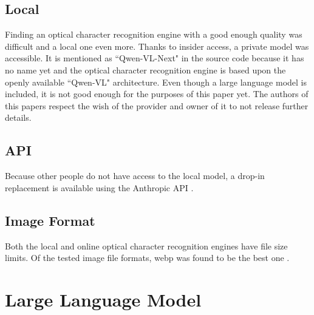 \documentclass[a4paper,11pt]{report}
\begin{document}
        \section{Local}
            Finding an optical character recognition engine with a good enough quality was difficult and a local one even more. Thanks to insider access, a private model was accessible. It is mentioned as ``Qwen-VL-Next" in the source code because it has no name yet and the optical character recognition engine is based upon the openly available ``Qwen-VL" \cite{bai2023qwenvlversatilevisionlanguagemodel} architecture. Even though a large language model is included, it is not good enough for the purposes of this paper yet. The authors of this papers respect the wish of the provider and owner of it to not release further details.
            
        \section{API}
            Because other people do not have access to the local model, a drop-in replacement is available using the Anthropic API \cite{claude3-5sonnet}.
            
            
        \section{Image Format}
            Both the local and online optical character recognition engines have file size limits. Of the tested image file formats, webp was found to be the best one \cite{zern-webp-15} \cite{dornauer2023webimageformatsassessment}.
            
            
    \chapter{Large Language Model}
    
\end{document}
